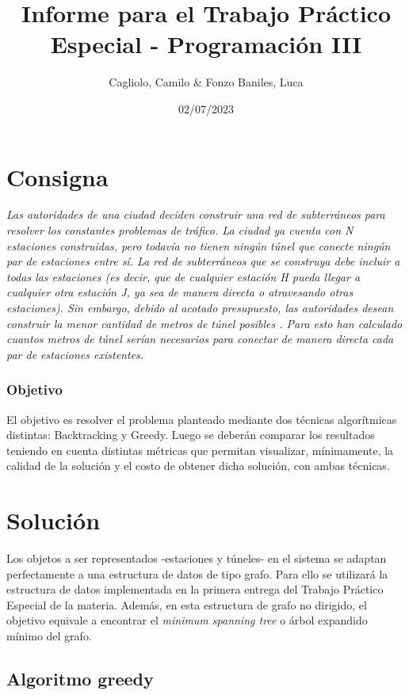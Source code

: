 \documentclass[10 pt, A4paper]{article}
\title{Informe para el Trabajo Práctico Especial - Programación III}
\author{Cagliolo, Camilo \& Fonzo Baniles, Luca}
\date{02/07/2023}
\begin{document}
	\pagestyle{fancy}
	\fancyhead{}
	\fancyhead[RE,LO]{\thepage}
	\fancyfoot{}
	
	\maketitle
	\section*{Consigna}
	\begin{displayquote}
		\textit{Las autoridades de una ciudad deciden construir una red de subterráneos para resolver los constantes problemas de tráfico. La ciudad ya cuenta con N estaciones construidas, pero todavía no tienen ningún túnel que conecte ningún par de estaciones entre sí. La red de subterráneos que se construya debe incluir a todas las estaciones (es decir, que de cualquier estación H pueda llegar a cualquier otra estación J, ya sea de manera directa o atravesando otras estaciones). Sin embargo, debido al acotado presupuesto, las autoridades desean construir la menor cantidad de metros de túnel posibles . Para esto han calculado cuantos metros de túnel serían necesarios para conectar de manera directa cada par de estaciones existentes.}
	\end{displayquote}
	\subsubsection*{Objetivo}
	El objetivo es resolver el problema planteado mediante dos técnicas algorítmicas distintas: Backtracking y Greedy. Luego se deberán comparar los resultados teniendo en cuenta distintas métricas que permitan visualizar, mínimamente, la calidad de la solución y el costo de obtener dicha solución, con ambas técnicas.
	\section*{Solución}
	
	Los objetos a ser representados -estaciones y túneles- en el sistema se adaptan perfectamente a una estructura de datos de tipo grafo. Para ello se utilizará la estructura de datos implementada en la primera entrega del Trabajo Práctico Especial de la materia. Además, en esta estructura de grafo no dirigido, el objetivo equivale a encontrar el \textit{minimum spanning tree} o árbol expandido mínimo del grafo.
	
	\subsection*{Algoritmo greedy}
	
\end{document}
